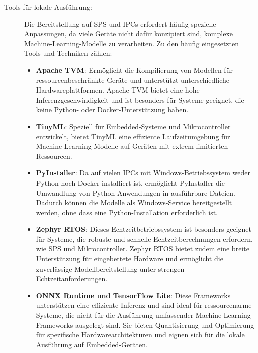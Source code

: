 \begin{description}
    \item[Tools für lokale Ausführung:] Die Bereitstellung auf SPS und IPCs erfordert häufig spezielle Anpassungen, da viele Geräte nicht dafür konzipiert sind, 
    komplexe Machine-Learning-Modelle zu verarbeiten. Zu den häufig eingesetzten Tools und Techniken zählen:
    \begin{itemize}
        \item \textbf{Apache TVM}: Ermöglicht die Kompilierung von Modellen für ressourcenbeschränkte Geräte und unterstützt unterschiedliche Hardwareplattformen. Apache TVM bietet eine hohe Inferenzgeschwindigkeit und ist besonders für Systeme geeignet, die keine Python- oder Docker-Unterstützung haben.
        \item \textbf{TinyML}: Speziell für Embedded-Systeme und Mikrocontroller entwickelt, bietet TinyML eine effiziente Laufzeitumgebung für Machine-Learning-Modelle auf Geräten mit extrem limitierten Ressourcen.
        \item \textbf{PyInstaller}: Da auf vielen IPCs mit Windows-Betriebssystem weder Python noch Docker installiert ist, ermöglicht PyInstaller die Umwandlung von Python-Anwendungen in ausführbare Dateien. Dadurch können die Modelle als Windows-Service bereitgestellt werden, ohne dass eine Python-Installation erforderlich ist.
        \item \textbf{Zephyr RTOS}: Dieses Echtzeitbetriebssystem ist besonders geeignet für Systeme, die robuste und schnelle Echtzeitberechnungen erfordern, wie SPS und Mikrocontroller. Zephyr RTOS bietet zudem eine breite Unterstützung für eingebettete Hardware und ermöglicht die zuverlässige Modellbereitstellung unter strengen Echtzeitanforderungen.
        \item \textbf{ONNX Runtime und TensorFlow Lite}: Diese Frameworks unterstützen eine effiziente Inferenz und sind ideal für ressourcenarme Systeme, die nicht für die Ausführung umfassender Machine-Learning-Frameworks ausgelegt sind. Sie bieten Quantisierung und Optimierung für spezifische Hardwarearchitekturen und eignen sich für die lokale Ausführung auf Embedded-Geräten.
    \end{itemize}


\end{description}
